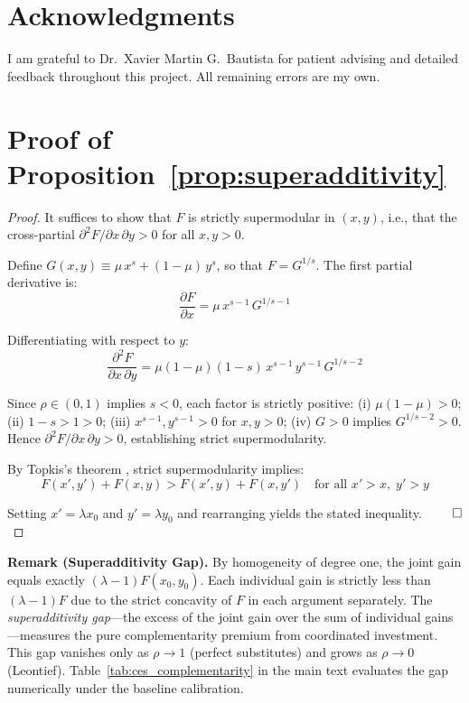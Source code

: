 \documentclass[12pt, a4paper]{article}
\begin{document}
\section*{Acknowledgments}

I am grateful to Dr.\ Xavier Martin G.\ Bautista for patient advising and detailed feedback throughout this project. All remaining errors are my own.




\appendix

\section{Proof of Proposition~\ref{prop:superadditivity}} \label{app:proof_superadditivity}

\begin{proof}
It suffices to show that $F$ is strictly supermodular in $(x, y)$, i.e., that the cross-partial $\partial^2 F / \partial x \, \partial y > 0$ for all $x, y > 0$.

Define $G(x,y) \equiv \mu \, x^s + (1-\mu) \, y^s$, so that $F = G^{1/s}$. The first partial derivative is:
\begin{equation*}
\frac{\partial F}{\partial x} = \mu \, x^{s-1} \, G^{1/s - 1}
\end{equation*}

Differentiating with respect to $y$:
\begin{equation*}
\frac{\partial^2 F}{\partial x \, \partial y} = \mu(1-\mu)(1-s) \, x^{s-1} \, y^{s-1} \, G^{1/s - 2}
\end{equation*}

Since $\rho \in (0,1)$ implies $s < 0$, each factor is strictly positive: (i) $\mu(1-\mu) > 0$; (ii) $1-s > 1 > 0$; (iii) $x^{s-1}, y^{s-1} > 0$ for $x, y > 0$; (iv) $G > 0$ implies $G^{1/s-2} > 0$. Hence $\partial^2 F / \partial x \, \partial y > 0$, establishing strict supermodularity.

By Topkis's theorem \citep{topkis1998}, strict supermodularity implies:
\begin{equation*}
F(x', y') + F(x, y) > F(x', y) + F(x, y')
\quad \text{for all } x' > x,\; y' > y
\end{equation*}

Setting $x' = \lambda x_0$ and $y' = \lambda y_0$ and rearranging yields the stated inequality. $\qed$
\end{proof}

\noindent \textbf{Remark (Superadditivity Gap).} By homogeneity of degree one, the joint gain equals exactly $(\lambda - 1) F(x_0, y_0)$. Each individual gain is strictly less than $(\lambda-1) F$ due to the strict concavity of $F$ in each argument separately. The \textit{superadditivity gap}---the excess of the joint gain over the sum of individual gains---measures the pure complementarity premium from coordinated investment. This gap vanishes only as $\rho \to 1$ (perfect substitutes) and grows as $\rho \to 0$ (Leontief). Table~\ref{tab:ces_complementarity} in the main text evaluates the gap numerically under the baseline calibration.
\end{document}

